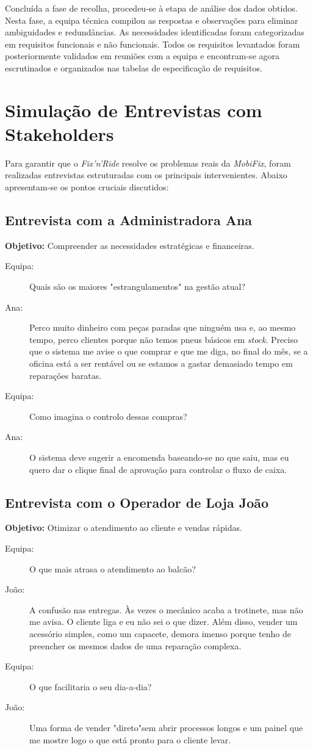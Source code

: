 \documentclass[a4paper,12pt]{scrreprt}
\begin{document}
Concluída a fase de recolha, procedeu-se à etapa de análise dos dados obtidos. Nesta fase, a equipa técnica compilou as respostas e observações para eliminar ambiguidades e redundâncias. As necessidades identificadas foram categorizadas em requisitos funcionais e não funcionais. Todos os requisitos levantados foram posteriormente validados em reuniões com a equipa e encontram-se agora escrutinados e organizados nas tabelas de especificação de requisitos. 

\section{Simulação de Entrevistas com Stakeholders}
Para garantir que o \textit{Fix'n'Ride} resolve os problemas reais da \textit{MobiFix}, foram realizadas entrevistas estruturadas com os principais intervenientes. Abaixo apresentam-se os pontos cruciais discutidos:

\subsection{Entrevista com a Administradora Ana}
\textbf{Objetivo:} Compreender as necessidades estratégicas e financeiras. 
\begin{description}
    \item[Equipa:] Quais são os maiores "estrangulamentos"  na gestão atual?
    \item[Ana:] Perco muito dinheiro com peças paradas que ninguém usa e, ao mesmo tempo, perco clientes porque não temos pneus básicos em \textit{stock}. Preciso que o sistema me avise o que comprar e que me diga, no final do mês, se a oficina está a ser rentável ou se estamos a gastar demasiado tempo em reparações baratas.
    \item[Equipa:] Como imagina o controlo dessas compras?
    \item[Ana:] O sistema deve sugerir a encomenda baseando-se no que saiu, mas eu quero dar o clique final de aprovação para controlar o fluxo de caixa.
\end{description}

\subsection{Entrevista com o Operador de Loja João}
\textbf{Objetivo:} Otimizar o atendimento ao cliente e vendas rápidas. 
\begin{description}
    \item[Equipa:] O que mais atrasa o atendimento ao balcão?
    \item[João:] A confusão nas entregas. Às vezes o mecânico acaba a trotinete, mas não me avisa. O cliente liga e eu não sei o que dizer. Além disso, vender um acessório simples, como um capacete, demora imenso porque tenho de preencher os mesmos dados de uma reparação complexa.
    \item[Equipa:] O que facilitaria o seu dia-a-dia?
    \item[João:] Uma forma de vender "direto"\space  sem abrir processos longos e um painel que me mostre logo o que está pronto para o cliente levar.
\end{description}
\end{document}
